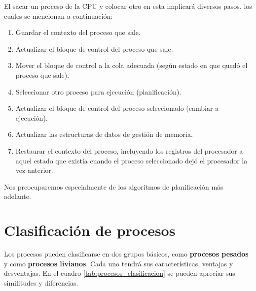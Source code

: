 El sacar un proceso de la CPU y colocar otro en esta implicará diversos pasos,
los cuales se mencionan a continuación:
\begin{enumerate}

	\item Guardar el contexto del proceso que sale.

	\item Actualizar el bloque de control del proceso que sale.

	\item Mover el bloque de control a la cola adecuada (según estado en que
	quedó el proceso que sale).

	\item Seleccionar otro proceso para ejecución (planificación).

	\item Actualizar el bloque de control del proceso seleccionado (cambiar
	a ejecución).

	\item Actualizar las estructuras de datos de gestión de memoria.

	\item Restaurar el contexto del proceso, incluyendo los
	registros del procesador a aquel estado que existía cuando el proceso
	seleccionado dejó el procesador la vez anterior.

\end{enumerate}

Nos preocuparemos especialmente de los algoritmos de planificación más adelante.

\section{Clasificación de procesos}
Los procesos pueden clasificarse en dos grupos básicos, como \textbf{procesos
pesados} y como \textbf{procesos livianos}. Cada uno tendrá sus características,
ventajas y desventajas. En el cuadro \ref{tab:procesos_clasificacion} se pueden
apreciar sus similitudes y diferencias.

